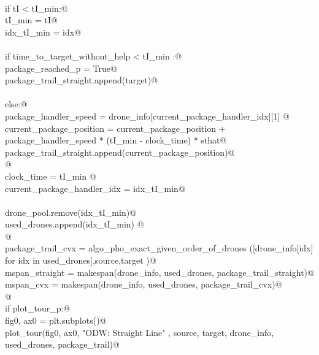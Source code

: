 \documentclass[10.0pt]{report}
\begin{document}
\begin{flushleft}
\begin{list}{}{}
\mbox{}\verb@@\\
\mbox{}\verb@                if tI < tI_min:@\\
\mbox{}\verb@                   tI_min     = tI@\\
\mbox{}\verb@                   idx_tI_min = idx@\\
\mbox{}\verb@@\\
\mbox{}\verb@          if time_to_target_without_help < tI_min :@\\
\mbox{}\verb@              package_reached_p = True@\\
\mbox{}\verb@              package_trail_straight.append(target)@\\
\mbox{}\verb@@\\
\mbox{}\verb@          else:@\\
\mbox{}\verb@              package_handler_speed    = drone_info[current_package_handler_idx][1] @\\
\mbox{}\verb@              current_package_position = current_package_position + package_handler_speed * (tI_min - clock_time) *  sthat@\\
\mbox{}\verb@              package_trail_straight.append(current_package_position)@\\
\mbox{}\verb@    @\\
\mbox{}\verb@              clock_time                  = tI_min @\\
\mbox{}\verb@              current_package_handler_idx = idx_tI_min@\\
\mbox{}\verb@@\\
\mbox{}\verb@              drone_pool.remove(idx_tI_min)@\\
\mbox{}\verb@              used_drones.append(idx_tI_min)  @\\
\mbox{}\verb@   @\\
\mbox{}\verb@    package_trail_cvx = algo_pho_exact_given_order_of_drones ([drone_info[idx] for idx in used_drones],source,target )@\\
\mbox{}\verb@    mspan_straight = makespan(drone_info, used_drones, package_trail_straight)@\\
\mbox{}\verb@    mspan_cvx      = makespan(drone_info, used_drones, package_trail_cvx)@\\
\mbox{}\verb@    @\\
\mbox{}\verb@    if plot_tour_p:@\\
\mbox{}\verb@         fig0, ax0 = plt.subplots()@\\
\mbox{}\verb@         plot_tour(fig0, ax0, "ODW: Straight Line"       , source, target, drone_info, used_drones, package_trail)@\\

\end{list}
\end{flushleft}
\end{document}
